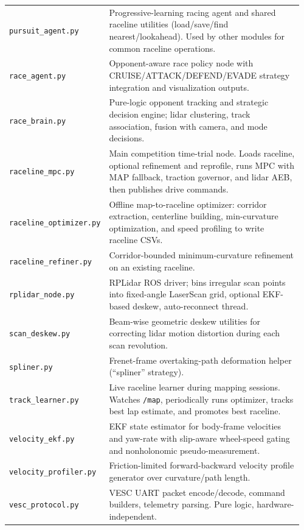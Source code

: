 \documentclass[11pt]{article}
\begin{document}
\begin{longtable}{p{0.30\linewidth}p{0.66\linewidth}}
\texttt{pursuit\_agent.py} & Progressive-learning racing agent and shared raceline utilities (load/save/find nearest/lookahead). Used by other modules for common raceline operations. \\
\texttt{race\_agent.py} & Opponent-aware race policy node with CRUISE/ATTACK/DEFEND/EVADE strategy integration and visualization outputs. \\
\texttt{race\_brain.py} & Pure-logic opponent tracking and strategic decision engine; lidar clustering, track association, fusion with camera, and mode decisions. \\
\texttt{raceline\_mpc.py} & Main competition time-trial node. Loads raceline, optional refinement and reprofile, runs MPC with MAP fallback, traction governor, and lidar AEB, then publishes drive commands. \\
\texttt{raceline\_optimizer.py} & Offline map-to-raceline optimizer: corridor extraction, centerline building, min-curvature optimization, and speed profiling to write raceline CSVs. \\
\texttt{raceline\_refiner.py} & Corridor-bounded minimum-curvature refinement on an existing raceline. \\
\texttt{rplidar\_node.py} & RPLidar ROS driver; bins irregular scan points into fixed-angle LaserScan grid, optional EKF-based deskew, auto-reconnect thread. \\
\texttt{scan\_deskew.py} & Beam-wise geometric deskew utilities for correcting lidar motion distortion during each scan revolution. \\
\texttt{spliner.py} & Frenet-frame overtaking-path deformation helper (``spliner'' strategy). \\
\texttt{track\_learner.py} & Live raceline learner during mapping sessions. Watches \texttt{/map}, periodically runs optimizer, tracks best lap estimate, and promotes best raceline. \\
\texttt{velocity\_ekf.py} & EKF state estimator for body-frame velocities and yaw-rate with slip-aware wheel-speed gating and nonholonomic pseudo-measurement. \\
\texttt{velocity\_profiler.py} & Friction-limited forward-backward velocity profile generator over curvature/path length. \\
\texttt{vesc\_protocol.py} & VESC UART packet encode/decode, command builders, telemetry parsing. Pure logic, hardware-independent. \\
\bottomrule
\end{longtable}
\end{document}
